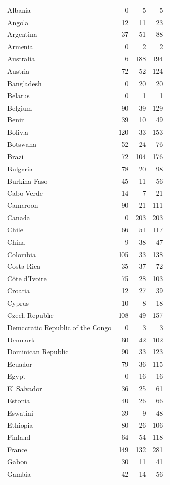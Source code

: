 \documentclass{article} %
\begin{document}
\begin{longtable}{l r r r}
Albania & 0 & 5 & 5 \\
Angola & 12 & 11 & 23 \\
Argentina & 37 & 51 & 88 \\
Armenia & 0 & 2 & 2 \\
Australia & 6 & 188 & 194 \\
Austria & 72 & 52 & 124 \\
Bangladesh & 0 & 20 & 20 \\
Belarus & 0 & 1 & 1 \\
Belgium & 90 & 39 & 129 \\
Benin & 39 & 10 & 49 \\
Bolivia & 120 & 33 & 153 \\
Botswana & 52 & 24 & 76 \\
Brazil & 72 & 104 & 176 \\
Bulgaria & 78 & 20 & 98 \\
Burkina Faso & 45 & 11 & 56 \\
Cabo Verde & 14 & 7 & 21 \\
Cameroon & 90 & 21 & 111 \\
Canada & 0 & 203 & 203 \\
Chile & 66 & 51 & 117 \\
China & 9 & 38 & 47 \\
Colombia & 105 & 33 & 138 \\
Costa Rica & 35 & 37 & 72 \\
Côte d'Ivoire & 75 & 28 & 103 \\
Croatia & 12 & 27 & 39 \\
Cyprus & 10 & 8 & 18 \\
Czech Republic & 108 & 49 & 157 \\
Democratic Republic of the Congo & 0 & 3 & 3 \\
Denmark & 60 & 42 & 102 \\
Dominican Republic & 90 & 33 & 123 \\
Ecuador & 79 & 36 & 115 \\
Egypt & 0 & 16 & 16 \\
El Salvador & 36 & 25 & 61 \\
Estonia & 40 & 26 & 66 \\
Eswatini & 39 & 9 & 48 \\
Ethiopia & 80 & 26 & 106 \\
Finland & 64 & 54 & 118 \\
France & 149 & 132 & 281 \\
Gabon & 30 & 11 & 41 \\
Gambia & 42 & 14 & 56 \\

\end{longtable}
\end{document}
